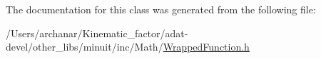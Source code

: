 The documentation for this class was generated from the following file\+:\begin{DoxyCompactItemize}
\item 
/\+Users/archanar/\+Kinematic\+\_\+factor/adat-\/devel/other\+\_\+libs/minuit/inc/\+Math/\mbox{\hyperlink{adat-devel_2other__libs_2minuit_2inc_2Math_2WrappedFunction_8h}{Wrapped\+Function.\+h}}\end{DoxyCompactItemize}
